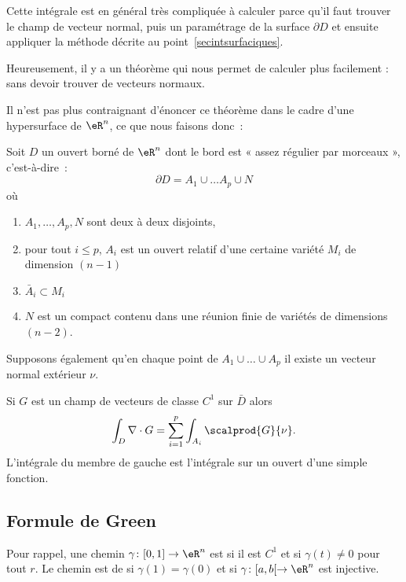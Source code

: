 Cette intégrale est en général très compliquée à calculer parce qu'il faut trouver le champ de vecteur normal, puis un paramétrage de la surface $\partial D$ et ensuite appliquer la méthode décrite au point~\ref{secintsurfaciques}.

Heureusement, il y a un théorème qui nous permet de calculer plus facilement : sans devoir trouver de vecteurs normaux.

Il n'est pas plus contraignant d'énoncer ce théorème dans le cadre d'une hypersurface de $\eR^n$, ce que nous faisons donc~:
\begin{theorem}
	Soit $D$ un ouvert borné de $\eR^n$ dont le bord est « assez régulier par morceaux », c'est-à-dire~:
	\begin{equation}
		\partial D = A_1 \cup \ldots A_p \cup N
	\end{equation}
	où
	\begin{enumerate}
		\item $A_1, \ldots, A_p, N$ sont deux à deux disjoints,
		\item pour tout $i \leq p$, $A_i$ est un ouvert relatif d'une certaine variété $M_i$ de dimension $(n-1)$
		\item $\bar A_i \subset M_i$
		\item $N$ est un compact contenu dans une réunion finie de variétés de dimensions $(n-2)$.
	\end{enumerate}
	Supposons également qu'en chaque point de $A_1 \cup \ldots \cup A_p$ il existe un vecteur normal extérieur $\nu$.

	Si $G$ est un champ de vecteurs de classe $C^1$ sur $\bar D$ alors
	\begin{equation}
		\int_D \nabla\cdot G = \sum_{i=1}^p \int_{A_i} \scalprod{G}{\nu}.
	\end{equation}
	L'intégrale du membre de gauche est l'intégrale sur un ouvert d'une simple fonction.
\end{theorem}

\subsection{Formule de Green}

Pour rappel, une chemin $\gamma\colon \mathopen[ 0 , 1 \mathclose]\to \eR^n$ est  si il est $C^1$ et si $\gamma(t)\neq 0$ pour tout $r$. Le chemin est de  si $\gamma(1)=\gamma(0)$ et si $\gamma\colon \mathopen[ a , b [\to \eR^n$ est injective.

